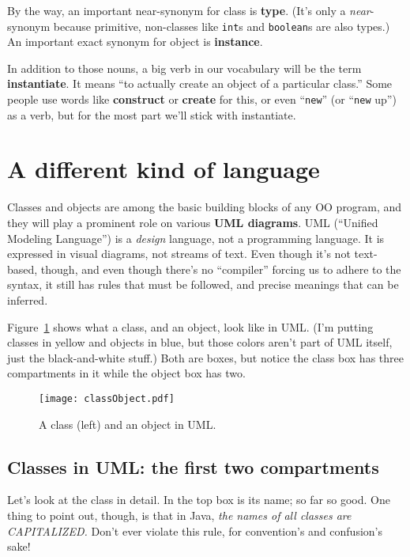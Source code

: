By the way, an important near-synonym for class is \textbf{type}. (It's only a
\textit{near}-synonym because primitive, non-classes like \texttt{int}s and
\texttt{boolean}s are also types.) An important exact synonym for object is
\textbf{instance}.

In addition to those nouns, a big verb in our vocabulary will be the term
\textbf{instantiate}. It means ``to actually create an object of a particular
class.'' Some people use words like \textbf{construct} or \textbf{create} for
this, or even ``\texttt{new}'' (or ``\texttt{new} up'') as a verb, but for the
most part we'll stick with instantiate.


\section{A different kind of language}
\label{sec:UMLclasses}

Classes and objects are among the basic building blocks of any OO program, and
they will play a prominent role on various \textbf{UML diagrams}. UML
(``Unified Modeling Language'') is a \textit{design} language, not a
programming language. It is expressed in visual diagrams, not streams of text.
Even though it's not text-based, though, and even though there's no
``compiler'' forcing us to adhere to the syntax, it still has rules that must
be followed, and precise meanings that can be inferred.

Figure~\ref{fig:classObject} shows what a class, and an object, look like in
UML. (I'm putting classes in yellow and objects in blue, but those colors
aren't part of UML itself, just the black-and-white stuff.) Both are boxes,
but notice the class box has three compartments in it while the object box has
two.

\begin{figure}[ht]
\centering
\texttt{[image: classObject.pdf]}   %
\caption{A class (left) and an object in UML.}
\label{fig:classObject}
\end{figure}

\subsection{Classes in UML: the first two compartments}

Let's look at the class in detail. In the top box is its name; so far so good.
One thing to point out, though, is that in Java, \textit{the names of all
classes are CAPITALIZED.} Don't ever violate this rule, for convention's and
confusion's sake!

